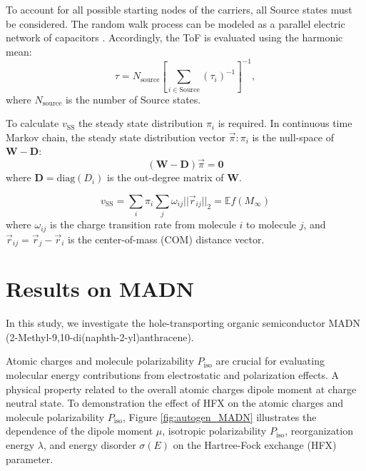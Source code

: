\documentclass[letterpaper,12pt]{article}
\begin{document}
To account for all possible starting nodes of the carriers, all Source states must be considered. The random walk process can be modeled as a parallel electric network of capacitors \cite{doyle_random_2000}. Accordingly, the ToF is evaluated using the harmonic mean:
\begin{equation} 
\tau = N_\text{source} \left[\sum_{i \in \text{Source}} (\tau_i)^{-1}\right]^{-1},
\label{eq:ToF}
\end{equation}
where $N_\text{source}$ is the number of Source states.

To calculate $v_\text{SS}$ the steady state distribution $\pi_i$ is required. In continuous time Markov chain, the steady state distribution vector $\vec{\pi}: \pi_i$ is the null-space of $\mathbf{W}-\mathbf{D}$:
\begin{equation}
    (\mathbf{W}-\mathbf{D} )\vec{\pi} = \mathbf{0}
\end{equation}
where $\mathbf{D} = \text{diag}(D_i)$ is the out-degree matrix of $\mathbf{W}$.

\begin{equation}
    v_\text{SS} = \sum_i \pi_i \sum_j \omega_{ij} || \vec{r}_{ij}||_2 = \mathbb{E}f(M_{\infty})
\end{equation} 
where $\omega_{ij}$ is the charge transition rate from molecule $i$ to molecule $j$, and $\vec{r}_{ij}=\vec{r}_j - \vec{r}_i$ is the center-of-mass (COM) distance vector. 

\section{Results on MADN}

In this study, we investigate the hole-transporting organic semiconductor MADN (2-Methyl-9,10-di(naphth-2-yl)anthracene). 

Atomic charges and molecule polarizability $P_\text{iso}$ are crucial for evaluating molecular energy contributions from electrostatic and polarization effects. A physical property related to the overall atomic charges dipole moment at charge neutral state. 
To demonstration the effect of HFX on the atomic charges and molecule polarizability $P_\text{iso}$,
Figure \ref{fig:autogen_MADN} illustrates the dependence of the dipole moment $\mu$, isotropic polarizability $P_\text{iso}$, reorganization energy $\lambda$, and energy disorder $\sigma(E)$ on the Hartree-Fock exchange (HFX) parameter.
\end{document}

